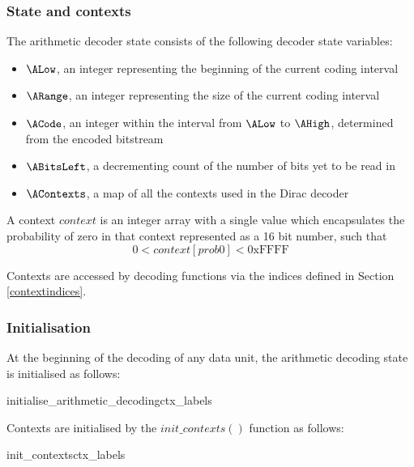 \subsubsection{State and contexts}
\label{stateandcontexts}

The arithmetic decoder state consists of the following decoder state variables:

\begin{itemize}
\item $\ALow$, an integer representing the beginning of the current coding interval
\item $\ARange$, an integer representing the size of the current coding interval
\item $\ACode$, an integer within the interval from $\ALow$ to $\AHigh$, determined from the encoded bitstream
\item $\ABitsLeft$, a decrementing count of the number of bits yet to be read in
\item $\AContexts$, a map of all the contexts used in the Dirac decoder
\end{itemize}

A context $context$ is an integer array with a single value which encapsulates
the probability of zero in that context represented as a 16 bit number, such that
\[0<context[prob0]<\text{0xFFFF}\]

Contexts are accessed by decoding functions via the indices defined in Section \ref{contextindices}. 

\subsubsection{Initialisation}
\label{initarith}

At the beginning of the decoding of any data unit, the arithmetic
decoding state is initialised as follows:

\begin{pseudo}{initialise\_arithmetic\_decoding}{ctx\_labels}
\bsEND
{}
\end{pseudo}

Contexts are initialised by the $init\_contexts()$ function as follows:

\begin{pseudo}{init\_contexts}{ctx\_labels}
\bsEND
\end{pseudo}

